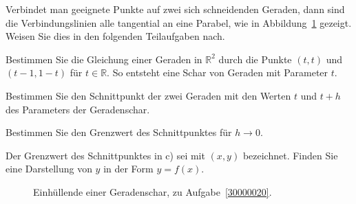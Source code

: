 Verbindet man geeignete Punkte auf zwei sich schneidenden Geraden,
dann sind die Verbindungslinien alle tangential an eine Parabel,
wie in Abbildung~\ref{30000020:figure} gezeigt.
Weisen Sie dies in den folgenden Teilaufgaben nach.
\begin{teilaufgaben}
\item
Bestimmen Sie die Gleichung einer Geraden in $\mathbb R^2$ durch die Punkte
$(t,t)$ und $(t-1,1-t)$ für $t\in\mathbb R$.
So entsteht eine Schar von Geraden mit Parameter $t$.
\item
Bestimmen Sie den Schnittpunkt der zwei Geraden mit den Werten
$t$ und $t+h$ des Parameters der Geradenschar.
\item
Bestimmen Sie den Grenzwert des Schnittpunktes für $h\to 0$.
\item
Der Grenzwert des Schnittpunktes in c) sei mit $(x,y)$ bezeichnet.
Finden Sie eine Darstellung von $y$ in der Form $y=f(x)$.
\end{teilaufgaben}

\begin{figure}[h]
\centering
{}
\caption{Einhüllende einer Geradenschar, zu Aufgabe~\ref{30000020}.
\label{30000020:figure}}
\end{figure}

